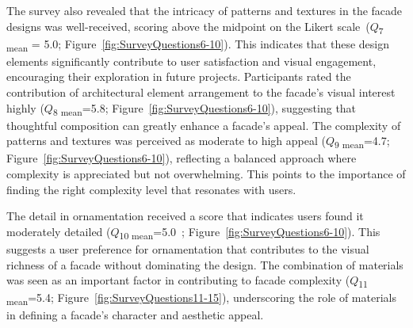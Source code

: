 The survey also revealed that the intricacy of patterns and textures in the facade designs was well-received, scoring above the midpoint on the Likert scale~(\(Q\)\textsubscript{\small{7 mean}} = 5.0; Figure~\ref{fig:SurveyQuestions6-10}). This indicates that these design elements significantly contribute to user satisfaction and visual engagement, encouraging their exploration in future projects.
Participants rated the contribution of architectural element arrangement to the facade's visual interest highly (\(Q\)\textsubscript{\small{8 mean}}=5.8; Figure~\ref{fig:SurveyQuestions6-10}), suggesting that thoughtful composition can greatly enhance a facade's appeal.
The complexity of patterns and textures was perceived as moderate to high appeal (\(Q\)\textsubscript{\small{9 mean}}=4.7; Figure~\ref{fig:SurveyQuestions6-10}), reflecting a balanced approach where complexity is appreciated but not overwhelming.
This points to the importance of finding the right complexity level that resonates with users.

The detail in ornamentation received a score that indicates users found it moderately detailed  (\(Q\)\textsubscript{\small{10 mean}}=5.0~; Figure~\ref{fig:SurveyQuestions6-10}).
This suggests a user preference for ornamentation that contributes to the visual richness of a facade without dominating the design.
The combination of materials was seen as an important factor in contributing to facade complexity (\(Q\)\textsubscript{\small{11 mean}}=5.4; Figure~\ref{fig:SurveyQuestions11-15}), underscoring the role of materials in defining a facade's character and aesthetic appeal.

